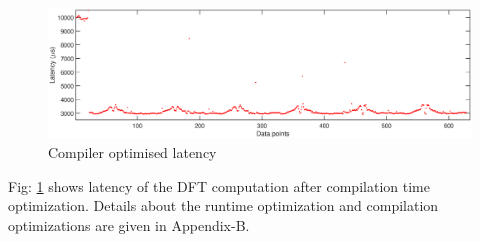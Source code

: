 \begin{figure}[h]
	\includegraphics[width=\textwidth]{fig/optimised_latency.eps}
	\caption{Compiler optimised latency}
	\label{fig:optimisedLatency}
\end{figure}
Fig: \ref{fig:optimisedLatency} shows latency of the DFT computation after compilation time optimization. Details about the runtime optimization and compilation optimizations are given in Appendix-B.

